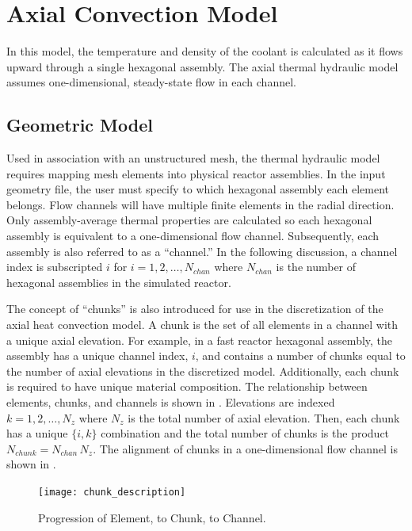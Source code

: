 \section{Axial Convection Model}
  \label{sec:axial_convection_model}
  In this model, the temperature and density of the coolant is calculated as
  it flows upward through a single hexagonal assembly. The axial thermal
  hydraulic model assumes one-dimensional, steady-state flow in each channel.

  \subsection{Geometric Model}
    Used in association with an unstructured mesh, the thermal hydraulic model
    requires mapping mesh elements into physical reactor assemblies. In the
    input geometry file, the user must specify to which hexagonal assembly each
    element belongs. Flow channels will have multiple finite elements in the
    radial direction. Only assembly-average thermal properties are calculated
    so each hexagonal assembly is equivalent to a one-dimensional flow channel.
    Subsequently, each assembly is also referred to as a ``channel.'' In the
    following discussion, a channel index is subscripted $i$ for $i =
    1,2,\ldots,N_{chan}$ where $N_{chan}$ is the number of hexagonal assemblies
    in the simulated reactor. 
    
    The concept of ``chunks'' is also introduced for use in the discretization
    of the axial heat convection model. A chunk is the set of all elements in a
    channel with a unique axial elevation. For example, in a fast reactor
    hexagonal assembly, the assembly has a unique channel index, $i$, and
    contains a number of chunks equal to the number of axial elevations in the
    discretized model. Additionally, each chunk is required to have unique
    material composition. The relationship between elements, chunks, and
    channels is shown in . Elevations are indexed 
    $k = 1,2,\ldots,N_z$ where $N_z$ is the total number of axial elevation.
    Then, each chunk has a unique $\{i,k\}$ combination and the total number of
    chunks is the product $N_{chunk} = N_{chan} \, N_z$.
    The alignment of chunks in a one-dimensional flow channel is shown in
    .

    \begin{figure}
      \centering
      \texttt{[image: chunk\_description]}
      \caption{Progression of Element, to Chunk, to Channel.}
      \label{fig:chunk_description}
    \end{figure}
    
